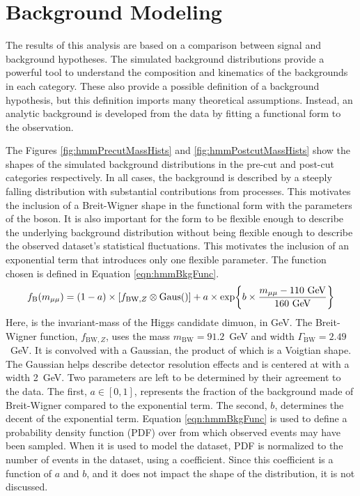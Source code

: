 \section{Background Modeling}\label{sec:hmmBkg}

The results of this analysis are based on a comparison between signal and background hypotheses.
The simulated background distributions provide a powerful tool to understand the composition and kinematics of the backgrounds in each category.  
These also provide a possible definition of a background hypothesis, but this definition imports many theoretical assumptions.
Instead, an analytic background is developed from the data by fitting a functional form to the observation.

The Figures \ref{fig:hmmPrecutMassHists} and \ref{fig:hmmPostcutMassHists} show the \muu shapes of the simulated background distributions in the pre-cut and post-cut categories respectively.
In all cases, the background is described by a steeply falling \muu distribution with substantial contributions from \Z processes.
This motivates the inclusion of a Breit-Wigner shape in the functional form with the parameters of the \Z boson.
It is also important for the form to be flexible enough to describe the underlying background distribution without being flexible enough to describe the observed dataset's statistical fluctuations.
This motivates the inclusion of an exponential term that introduces only one flexible parameter.
The function chosen is defined in Equation \ref{eqn:hmmBkgFunc}. 
\begin{equation}\begin{split}\label{eqn:hmmBkgFunc}
    f_\text{B}(\muu) = (1-a)\times [f_{\text{BW},Z}\otimes\text{Gaus}()]+a\times\exp{b\times\frac{\muu-110\text{ GeV}}{160\text{ GeV}}}
\end{split}\end{equation} 
Here, \muu is the invariant-mass of the Higgs candidate dimuon, in GeV.
The Breit-Wigner function, $f_{\text{BW},Z}$, uses the \Z mass $m_\text{BW}=91.2$~GeV and width $\Gamma_\text{BW}=2.49$~GeV.
It is convolved with a Gaussian, the product of which is a Voigtian shape.
The Gaussian helps describe detector resolution effects and is centered at \muu with a width 2~GeV.
Two parameters are left to be determined by their agreement to the data.
The first, $a\in[0,1]$, represents the fraction of the background made of Breit-Wigner compared to the exponential term.
The second, $b$, determines the decent of the exponential term.
Equation \ref{eqn:hmmBkgFunc} is used to define a probability density function (PDF) over \mll from which observed events may have been sampled. 
When it is used to model the dataset, PDF is normalized to the number of events in the dataset, using a coefficient.
Since this coefficient is a function of $a$ and $b$, and it does not impact the shape of the distribution, it is not discussed.


